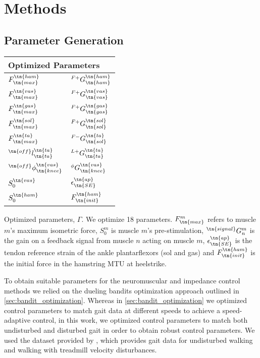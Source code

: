 \section{Methods}

\subsection{Parameter Generation}\label{sec:param_gen_nm_imp}
\begin{margintable}    
    \centering
    \normalsize
    \begin{tabular}{ll}
        \multicolumn{2}{l}{Optimized Parameters} \\
        \midrule
        $F_\tn{max}^\tn{ham}$              & $^{F+}G_\tn{ham}^\tn{ham}$   \\
        $F_\tn{max}^\tn{vas}$              & $^{F+}G_\tn{vas}^\tn{vas}$   \\
        $F_\tn{max}^\tn{gas}$              & $^{F+}G_\tn{gas}^\tn{gas}$   \\
        $F_\tn{max}^\tn{sol}$              & $^{F+}G_\tn{sol}^\tn{sol}$   \\
        $F_\tn{max}^\tn{ta}$               & $^{F-}G_\tn{sol}^\tn{ta}$    \\
        $^\tn{off}l_\tn{ta}^\tn{ta}$       & $^{L+}G_\tn{ta}^\tn{ta}$     \\
        $^\tn{off}\phi_\tn{knee}^\tn{vas}$ & ${^\phi}G_\tn{knee}^\tn{vas}$ \\
        $S_0^\tn{vas}$                     & $\epsilon_\tn{SE}^\tn{ap}$   \\
        $S_0^\tn{ham}$                     & $F_\tn{init}^\tn{ham}$       \\
    \end{tabular}
    \caption[Parameters optimized for parameter set generation for experiment
    comparing neuromuscular and impedance control]{Optimized parameters,
    $\Gamma$. We optimize 18 parameters. $F_\tn{max}^m$ refers to muscle $m$'s
    maximum isometric force, $S_0^m$ is muscle $m$'s pre-stimulation,
    $^\tn{signal} G_n^m$ is the gain on a feedback signal from muscle $n$
    acting on muscle $m$, $\epsilon_\tn{SE}^\tn{ap}$ is the tendon reference
    strain of the ankle plantarflexors (sol and gas) and $F_\tn{init}^\tn{ham}$
    is the initial force in the hamstring MTU at
    heelstrike.}\label{tab:nm_params_treadmill_exp}
\end{margintable}
To obtain suitable parameters for the neuromuscular and impedance control
methods we relied on the dueling bandits optimization approach outlined in
\cref{sec:bandit_optimization}. Whereas in \cref{sec:bandit_optimization} we
optimized control parameters to match gait data at different speeds to achieve a
speed-adaptive control, in this work, we optimized control parameters to match
both undisturbed and disturbed gait in order to obtain robust control
parameters. We used the dataset provided by \citet{moore2015elaborate}, which
provides gait data for undisturbed walking and walking with treadmill velocity
disturbances. 

